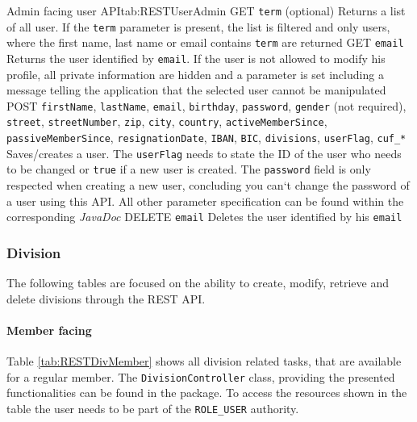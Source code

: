 \begin{RESTTable}{Admin facing user API}{tab:RESTUserAdmin}
		{GET}
		{\texttt{term} (optional)} 
		{Returns a list of all user. If the \texttt{term} parameter is present, the list is filtered and only users, where the first name, last name or email contains \texttt{term} are returned}
		{GET}
		{\texttt{email}}
		{Returns the user identified by \texttt{email}. If the user is not allowed to modify his profile, all private information are hidden and a parameter is set including a message telling the application that the selected user cannot be manipulated}
		{POST}
		{\texttt{firstName}, \texttt{lastName}, \texttt{email}, \texttt{birthday}, \texttt{password}, \texttt{gender} (not required), \texttt{street}, \texttt{streetNumber}, \texttt{zip}, \texttt{city}, \texttt{country}, \texttt{activeMemberSince}, \texttt{passiveMemberSince}, \texttt{resignationDate}, \texttt{IBAN}, \texttt{BIC}, \texttt{divisions}, \texttt{userFlag}, \texttt{cuf\_*}} 
		{Saves/creates a user. The \texttt{userFlag} needs to state the ID of the user who needs to be changed or \texttt{true} if a new user is created. The \texttt{password} field is only respected when creating a new user, concluding you can`t change the password of a user using this API. All other parameter specification can be found within the corresponding \emph{JavaDoc}}
		{DELETE}
		{\texttt{email}}
		{Deletes the user identified by his \texttt{email}}
\end{RESTTable}

\subsubsection{Division}
The following tables are focused on the ability to create, modify, retrieve and delete divisions through the \gls{REST} {API}.

\paragraph{Member facing}
Table \vref{tab:RESTDivMember} shows all division related tasks, that are available for a regular member. The \texttt{DivisionController} class, providing the presented functionalities can be found in the  package. To access the resources shown in the table the user needs to be part of the \texttt{ROLE\_USER} authority.

